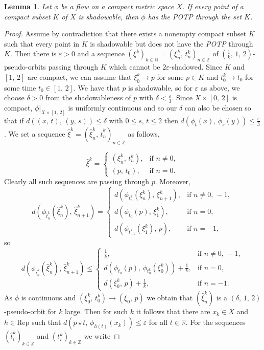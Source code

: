 \documentclass{amsart}
\newtheorem{lemma}[theorem]{Lemma}
\theoremstyle{definition}
\newcommand{\ep}{\varepsilon}
\begin{document}
\begin{lemma}\label{lemma3}
Let $\phi$ be a flow on a compact metric space $X$. If every point of a compact subset $K$ of $X$ is shadowable, then $\phi$ has the POTP through the set $K$.
\end{lemma}
\begin{proof}
Assume by contradiction that there exists a nonempty compact subset $K$ such that every point in $K$ is shadowable but does not have the {\em POTP} through $K$. Then there is $\ep > 0$ and a sequence $(\xi^k)_{k\in\mathbb{N}}=(\xi_n^k,\,t_n^k)_{n\in\mathbb{Z}}$ of $(\frac{1}{k},\,1,\,2)$-pseudo-orbits passing through $K$ which cannot be $2\ep$-shadowed. Since $K$ and $[1,\,2]$ are compact, we can assume that $\xi_0^k\to p$ for some $p\in K$ and $t_0^k\to t_0$ for some time $t_0\in[1,\,2]$. We have that $p$ is shadowable, so for $\ep$ as above, we choose $\delta > 0$ from the shadowableness of $p$ with $\delta < \frac{\ep}{3}$. Since $X\times [0,\,2]$ is compact, $\phi|_{X\times [1,\,2]}$ is uniformly continuous and so our $\delta$ can also be chosen so that if $d((x,\, t),\,(y,\,s))\leq \delta$ with $0\leq s,\,t\leq 2$ then $d(\phi_t(x),\,\phi_s(y))\leq \frac{\ep}{3}$. We set a sequence $\hat{\xi}^k=(\hat{\xi}_n^k,\,\hat{t}_n^k)_{n\in\mathbb{Z}}$ as follows,
        
        \[
          \hat{\xi}^k =
            \begin{cases}
              (\xi^k_n,\, t_n^k), &\mbox{if } n\neq0,\\
              (p,\,t_0),        &\mbox{if } n = 0.
            \end{cases}
        \]
Clearly all such sequences are passing through $p$. Moreover,
     \[
          d(\phi_{\hat{t}_n^k}(\hat{\xi}_n^k),\, \hat{\xi}_{n+1}^k) =
            \begin{cases}
              d(\phi_{t_n^k}(\xi_n^k),\, \xi_{n+1}^k), &\mbox{if } n\neq0,\,-1,\\
              d(\phi_{t_0}(p),\,\xi_1^k),        &\mbox{if } n = 0,\\
              d(\phi_{t_{-1}^k}(\xi_1^k),\,p),    &\mbox{if } n = -1,
            \end{cases}
        \]
so   
       \[
          d(\phi_{\hat{t}_n^k}(\hat{\xi}_n^k),\, \hat{\xi}_{n+1}^k) \leq
            \begin{cases}
              \frac{1}{k}, &\mbox{if } n\neq0,\,-1,\\
              d(\phi_{t_0}(p),\,\phi_{t_0^k}(\xi_0^k))+\frac{1}{k},        &\mbox{if } n = 0,\\
              d(\xi_{0}^k,\,p)+\frac{1}{k},    &\mbox{if } n = -1.
            \end{cases}
        \]       
As $\phi$ is continuous and $(\xi_0^k,\, t_0^k)\to (\xi_0,\,p)$ we obtain that $(\hat{\xi}_n^k)$ is a $(\delta,\,1,\,2)$-pseudo-orbit for $k$ large. Then for such $k$ it follows that there are $x_k\in X$ and $h\in \mathrm{Rep}$  such that $d(p\star t,\,\phi_{h(t)}(x_k))\leq\ep$ for all $t\in\mathbb{R}$.  For the sequences $(\hat{t}_i^k)_{k\in\mathbb{Z}}$ and $(t_i^k)_{k\in\mathbb{Z}}$ we write
       

\end{proof}
\end{document}
